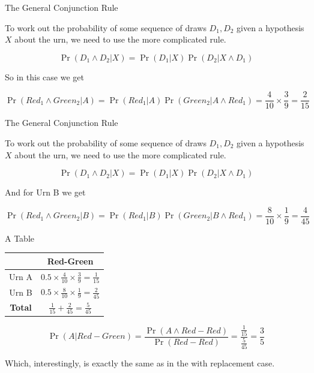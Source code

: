 \documentclass[
  ignorenonframetext,
]{beamer}
\renewcommand{\,}{\text{, }}
\begin{document}
\begin{frame}{The General Conjunction Rule}
\protect\hypertarget{the-general-conjunction-rule}{}

To work out the probability of some sequence of draws \(D_1, D_2\) given
a hypothesis \(X\) about the urn, we need to use the more complicated
rule.

\[
\Pr(D_1 \wedge D_2 | X) = \Pr(D_1 | X) \Pr(D_2 | X \wedge D_1)
\]

\pause

So in this case we get

\[
\Pr(Red_1 \wedge Green_2 | A) = \Pr(Red_1 | A)\Pr(Green_2 | A \wedge Red_1) = \frac{4}{10} \times \frac{3}{9} = \frac{2}{15}
\]

\end{frame}

\begin{frame}{The General Conjunction Rule}
\protect\hypertarget{the-general-conjunction-rule-1}{}

To work out the probability of some sequence of draws \(D_1, D_2\) given
a hypothesis \(X\) about the urn, we need to use the more complicated
rule.

\[
\Pr(D_1 \wedge D_2 | X) = \Pr(D_1 | X) \Pr(D_2 | X \wedge D_1)
\]

And for Urn B we get

\[
\Pr(Red_1 \wedge Green_2 | B) = \Pr(Red_1 | B)\Pr(Green_2 | B \wedge Red_1) = \frac{8}{10} \times \frac{1}{9} = \frac{4}{45}
\]

\end{frame}

\begin{frame}{A Table}
\protect\hypertarget{a-table-4}{}

\begin{longtable}[]{@{}cc@{}}
\toprule
& Red-Green\tabularnewline
\midrule
\endhead
Urn A &
\(0.5 \times \frac{4}{10} \times \frac{3}{9} = \frac{1}{15}\)\tabularnewline
Urn B &
\(0.5 \times \frac{8}{10} \times \frac{1}{9} = \frac{2}{45}\)\tabularnewline
\textbf{Total} &
\(\frac{1}{15} + \frac{2}{45} = \frac{5}{45}\)\tabularnewline
\bottomrule
\end{longtable}

\pause

\[
\Pr(A | Red-Green) = \frac{\Pr(A \wedge Red-Red)}{\Pr(Red-Red)} = \frac{\frac{1}{15}}{\frac{5}{45}} = \frac{3}{5}
\]

Which, interestingly, is exactly the same as in the with replacement
case.

\end{frame}
\end{document}
